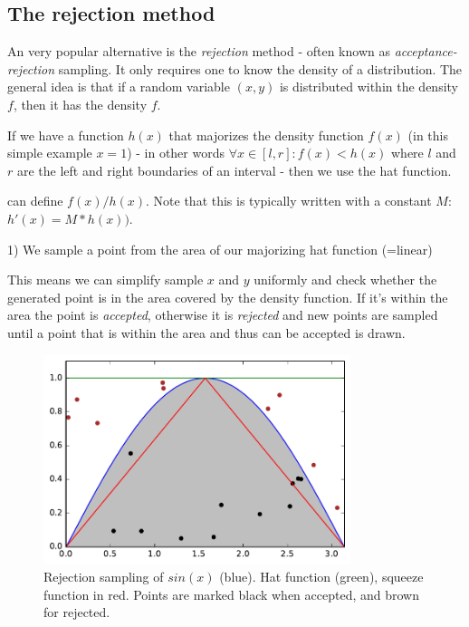 \documentclass[]{article}
\begin{document}
\subsection{The rejection method}

An very popular alternative is the \textit{rejection} method - often known as \textit{acceptance-rejection} sampling. It only requires one to know the density of a distribution. The general idea is that if a random variable $(x, y)$ is distributed within the density $f$, then it has the density $f$.

If we have a function $h(x)$ that majorizes the density function $f(x)$ (in this simple example $x = 1$) - in other words $ \forall x \in [l, r]: f(x) < h(x)$ where $l$ and $r$ are the left and right boundaries of an interval - then we use the hat function.

 can define $f(x) / h(x)$. Note that this is typically written with a constant $M$: $h'(x) = M * h(x))$. 

1) We sample a point from the area of our majorizing hat function (=linear)


This means we can simplify sample $x$ and $y$ uniformly and check whether the generated point is in the area covered by the density function. If it's within the area the point is \textit{accepted}, otherwise it is \textit{rejected} and new points are sampled until a point that is within the area and thus can be accepted is drawn.

\begin{figure}[h!]
\centering
\includegraphics[width=0.8\textwidth]{figs/rejection_sampling.pdf}
\caption{Rejection sampling of $sin(x)$ (blue). Hat function (green), squeeze function in red. Points are marked black when accepted, and brown for rejected.}
\label{fig:rejection_method}
\end{figure}
\end{document}

